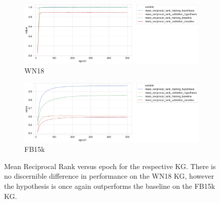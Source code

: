
\begin{figure}[H]
	\begin{subfigure}[b]{.5\linewidth}
   		\centering
    		\includegraphics[width=1.0\linewidth, height=0.6\linewidth]{WN18_mean_reciprocal_rank_Results}
		\captionsetup{justification=centering}
		\caption{WN18}
	\end{subfigure}
	\begin{subfigure}[b]{.5\linewidth}
   		\centering
		\includegraphics[width=1.0\linewidth, height=0.6\linewidth]{FB15k_mean_reciprocal_rank_Results}
		\captionsetup{justification=centering}
		\caption{FB15k}
	\end{subfigure}
	\caption{Mean Reciprocal Rank versus epoch for the respective KG. There is no discernible difference in performance on the WN18 KG, however the hypothesis is once again outperforms the baseline on the FB15k KG.}
\end{figure}

